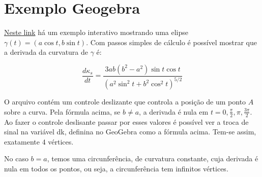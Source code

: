 \documentclass[12pt,letterpaper]{article}
\begin{document}
	\section{Exemplo Geogebra}
	\href{https://www.geogebra.org/calculator/kzzrgkxp}{Neste link} há um exemplo interativo mostrando uma elipse $\gamma(t)=(a\cos t,b\sin t)$. Com passos simples de cálculo é possível mostrar que a derivada da curvatura de $\gamma$ é:
	
	$$\dfrac{d\kappa_s}{dt}=\dfrac{3ab(b^2-a^2)\sin t\cos t}{(a^2\sin^2t+b^2\cos^2t)^{5/2}}$$
	
	O arquivo contém um controle deslizante que controla a posição de um ponto $A$ sobre a curva. Pela fórmula acima, se $b\neq a$, a derivada é nula em $t=0,\frac{\pi}2,\pi,\frac{3\pi}2$. Ao fazer o controle deslisante passar por esses valores é possível ver a troca de sinal na variável dk, definina no GeoGebra como a fórmula acima. Tem-se assim, exatamente 4 vértices.
	
	No caso $b=a$, temos uma circunferência, de curvatura constante, cuja derivada é nula em todos os pontos, ou seja, a circunferência tem infinitos vértices.
	
	\newpage
%	
	\printbibliography
\end{document}

